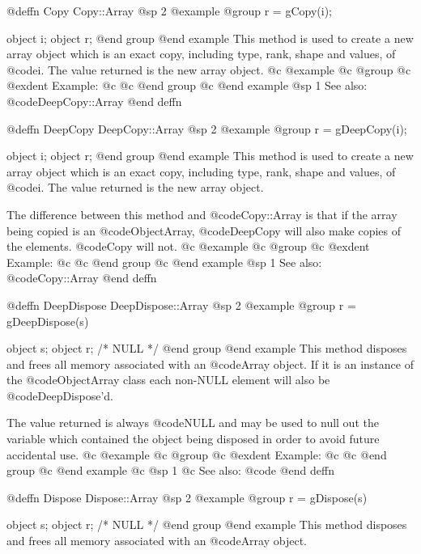 @deffn {Copy} Copy::Array
@sp 2
@example
@group
r = gCopy(i);

object  i;
object  r;
@end group
@end example
This method is used to create a new array object which is an exact copy,
including type, rank, shape and values, of @code{i}.  The value returned
is the new array object.
@c @example
@c @group
@c @exdent Example:
@c 
@c @end group
@c @end example
@sp 1
See also:  @code{DeepCopy::Array}
@end deffn








@deffn {DeepCopy} DeepCopy::Array
@sp 2
@example
@group
r = gDeepCopy(i);

object  i;
object  r;
@end group
@end example
This method is used to create a new array object which is an exact copy,
including type, rank, shape and values, of @code{i}.  The value returned
is the new array object.

The difference between this method and @code{Copy::Array} is that if the
array being copied is an @code{ObjectArray}, @code{DeepCopy} will also
make copies of the elements.  @code{Copy} will not.
@c @example
@c @group
@c @exdent Example:
@c 
@c @end group
@c @end example
@sp 1
See also:  @code{Copy::Array}
@end deffn









@deffn {DeepDispose} DeepDispose::Array
@sp 2
@example
@group
r = gDeepDispose(s)

object  s;
object  r;     /*  NULL  */
@end group
@end example
This method disposes and frees all memory associated with an @code{Array}
object.  If it is an instance of the @code{ObjectArray} class each
non-NULL element will also be @code{DeepDispose}'d.  

The value returned is always @code{NULL} and may be used to null out
the variable which contained the object being disposed in order to
avoid future accidental use.
@c @example
@c @group
@c @exdent Example:
@c 
@c @end group
@c @end example
@c @sp 1
@c See also:  @code{}
@end deffn












@deffn {Dispose} Dispose::Array
@sp 2
@example
@group
r = gDispose(s)

object  s;
object  r;     /*  NULL  */
@end group
@end example
This method disposes and frees all memory associated with an @code{Array}
object.  

